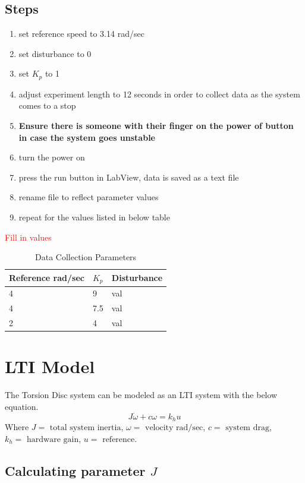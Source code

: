 \documentclass[11pt,titlepage]{article}
\begin{document}
	\subsection*{Steps}
		\begin{enumerate}
			\item set reference speed to 3.14 rad/sec
			\item set disturbance to 0
			\item set $K_p$ to 1
			\item adjust experiment length to 12 seconds in order to collect data as the system comes to a stop
			\item \textbf{Ensure there is someone with their finger on the power of button in case the system goes unstable}
			\item turn the power on
			\item press the run button in LabView, data is saved as a text file
			\item rename file to reflect parameter values
			\item repeat for the values listed in below table
		\end{enumerate}
		\textcolor{red}{Fill in values}
		\begin{table}[h!]
			\centering
			\begin{tabular}{|m{4cm}|m{3cm}|m{3cm}|} 
				\hline
				Reference rad/sec & $K_p$ & Disturbance \\ 
				\hline
				4 & 9 & val \\
				\hline
				4 & 7.5 & val\\
				\hline
				2 & 4 & val \\
				\hline
			\end{tabular}
			\caption{Data Collection Parameters} \label{table:data_param}
		\end{table}

\section{LTI Model} \label{sec:LTI}
	The Torsion Disc system can be modeled as an LTI system with the below equation.
	\begin{equation} \label{eq:lti}
		J\dot{\omega}+c\omega=k_hu
	\end{equation}
	Where $J=\mbox{ total system inertia}$, $\omega=\mbox{ velocity rad/sec}$, $c=\mbox{ system drag}$, $k_h=\mbox{ hardware gain}$, $u=\mbox{ reference}$.

	\subsection{Calculating parameter $J$}
\end{document}
